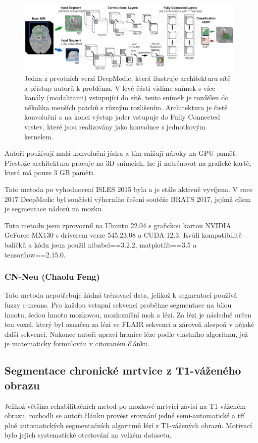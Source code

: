 \documentclass[11pt]{article}
\begin{document}
\begin{figure}[htp]
	\centering
	\includegraphics[width=\textwidth]{DeepMedic}
	\caption{Jedna z prvotních verzí DeepMedic, která ilustruje architekturu sítě a přístup autorů k problému. V levé části vidíme snímek s více kanály (modalitami) vstupující do sítě, tento snímek je rozdělen do několika menších patchů s různým rozlišením. Architektura je čistě konvoluční a na konci výstup jader vstupuje do Fully Connected vrstev, které jsou realizovány jako konvoluce s jednotkovým kernelem.}
	\label{img-DeepMedic}
\end{figure}

Autoři používají malá konvoluční jádra a tím snižují nároky na GPU paměť. Přestože architektura pracuje na 3D snímcích, lze ji natrénovat na grafické kartě, která má pouze 3 GB paměti.

Tato metoda po vyhodnocení ISLES 2015 byla a je stále aktivně vyvíjena. V roce 2017 DeepMedic byl součástí výherního řešení soutěže BRATS 2017, jejímž cílem je segmentace nádorů na mozku. \cite{Kamnitsas_2017, kamnitsas2017ensembles}

Tuto metodu jsem zprovoznil na Ubuntu 22.04 s grafickou kartou NVIDIA GeForce MX130 s driverem verze 545.23.08 a CUDA 12.3. Kvůli kompatibilitě balíčků a kódu jsem použil nibabel==3.2.2, matplotlib==3.5 a tensorflow==2.15.0.

\subsubsection{CN-Neu (Chaolu Feng) \cite{cn-neu}}
\label{lbl-cnNeu}
Tato metoda nepotřebuje žádná trénovací data, jelikož k segmentaci používá fuzzy c-means. Pro každou vstupní sekvenci proběhne segmentace na bílou hmotu, šedou hmotu mozkovou, mozkomíšní mok a lézi. Za lézi je následně určen ten voxel, který byl označen za lézi ve FLAIR sekvenci a zároveň alespoň v nějaké další sekvenci. Nakonec autoři upraví hranice léze podle vlastního algoritmu, jež je matematicky formulován v citovaném článku.

\subsection{Segmentace chronické mrtvice z T1-váženého obrazu}
Jelikož většina rehabilitačních metod po mozkové mrtvici závisí na T1-váženém obrazu, rozhodli se autoři článku \cite{Ito2018} provést srovnání jedné semi-automatické a tří plně automatických segmentačních algoritmů lézí z T1-vážených obrazů. Motivací bylo jejich systematické otestování na velkém datasetu.
\end{document}
